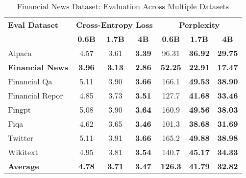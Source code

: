 
\begin{table}[h]
\centering
\caption[Financial News: Evaluation Results]{Financial News Dataset: Evaluation Across Multiple Datasets}
\label{tab:news_articles_results}
\begin{tabular}{l|ccc|ccc}
\hline
\textbf{Eval Dataset} & \multicolumn{3}{c|}{\textbf{Cross-Entropy Loss}} & \multicolumn{3}{c}{\textbf{Perplexity}} \\
\cline{2-4} \cline{5-7}
  & \textbf{0.6B} & \textbf{1.7B} & \textbf{4B} & \textbf{0.6B} & \textbf{1.7B} & \textbf{4B} \\
\hline
Alpaca & 4.57 & 3.61 & \textbf{3.39} & 96.31 & \textbf{36.92} & \textbf{29.75} \\
\textbf{Financial News} & \textbf{3.96} & \textbf{3.13} & \textbf{2.86} & \textbf{52.25} & \textbf{22.91} & \textbf{17.47} \\
Financial Qa & 5.11 & 3.90 & \textbf{3.66} & 166.1 & \textbf{49.53} & \textbf{38.90} \\
Financial Repor & 4.85 & 3.73 & \textbf{3.51} & 127.7 & \textbf{41.68} & \textbf{33.46} \\
Fingpt & 5.08 & 3.90 & \textbf{3.64} & 160.9 & \textbf{49.56} & \textbf{38.03} \\
Fiqa & 4.62 & 3.65 & \textbf{3.46} & 101.3 & \textbf{38.68} & \textbf{31.69} \\
Twitter & 5.11 & 3.91 & \textbf{3.66} & 165.2 & \textbf{49.88} & \textbf{38.98} \\
Wikitext & 4.95 & 3.81 & \textbf{3.54} & 140.7 & \textbf{45.17} & \textbf{34.33} \\
\hline
\textbf{Average} & \textbf{4.78} & \textbf{3.71} & \textbf{3.47} & \textbf{126.3} & \textbf{41.79} & \textbf{32.82} \\
\hline
\end{tabular}
\end{table}

